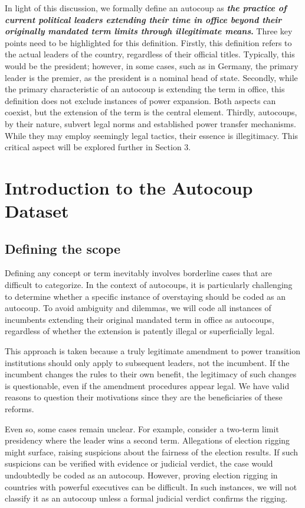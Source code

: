 \documentclass[
  12pt,
]{report}
\begin{document}
In light of this discussion, we formally define an autocoup as
\textbf{\emph{the practice of current political leaders extending their
time in office beyond their originally mandated term limits through
illegitimate means}.} Three key points need to be highlighted for this
definition. Firstly, this definition refers to the actual leaders of the
country, regardless of their official titles. Typically, this would be
the president; however, in some cases, such as in Germany, the primary
leader is the premier, as the president is a nominal head of state.
Secondly, while the primary characteristic of an autocoup is extending
the term in office, this definition does not exclude instances of power
expansion. Both aspects can coexist, but the extension of the term is
the central element. Thirdly, autocoups, by their nature, subvert legal
norms and established power transfer mechanisms. While they may employ
seemingly legal tactics, their essence is illegitimacy. This critical
aspect will be explored further in Section 3.

\section{Introduction to the Autocoup
Dataset}\label{introduction-to-the-autocoup-dataset}

\subsection{Defining the scope}\label{defining-the-scope}

Defining any concept or term inevitably involves borderline cases that
are difficult to categorize. In the context of autocoups, it is
particularly challenging to determine whether a specific instance of
overstaying should be coded as an autocoup. To avoid ambiguity and
dilemmas, we will code all instances of incumbents extending their
original mandated term in office as autocoups, regardless of whether the
extension is patently illegal or superficially legal.

This approach is taken because a truly legitimate amendment to power
transition institutions should only apply to subsequent leaders, not the
incumbent. If the incumbent changes the rules to their own benefit, the
legitimacy of such changes is questionable, even if the amendment
procedures appear legal. We have valid reasons to question their
motivations since they are the beneficiaries of these reforms.

Even so, some cases remain unclear. For example, consider a two-term
limit presidency where the leader wins a second term. Allegations of
election rigging might surface, raising suspicions about the fairness of
the election results. If such suspicions can be verified with evidence
or judicial verdict, the case would undoubtedly be coded as an autocoup.
However, proving election rigging in countries with powerful executives
can be difficult. In such instances, we will not classify it as an
autocoup unless a formal judicial verdict confirms the rigging.
\end{document}
